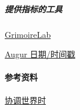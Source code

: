 \hypertarget{ux63d0ux4f9bux6307ux6807ux7684ux5de5ux5177}{%
\subparagraph{提供指标的工具}\label{ux63d0ux4f9bux6307ux6807ux7684ux5de5ux5177}}

\href{https://chaoss.github.io/grimoirelab/}{GrimoireLab}

\href{https://docs.augur.net/\#dates-timestamps}{Augur 日期/时间戳}

\hypertarget{ux53c2ux8003ux8d44ux6599}{%
\paragraph{参考资料}\label{ux53c2ux8003ux8d44ux6599}}

\href{https://en.wikipedia.org/wiki/Coordinated_Universal_Time}{协调世界时}
